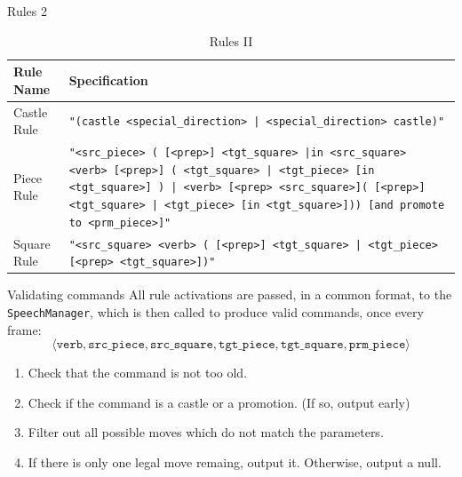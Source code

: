\documentclass[english]{beamer}
\begin{document}
\begin{frame}{Rules 2}
    \begin{table}[h]
        \centering
        \caption{Rules II}
        \small %
        \begin{tabularx}{1.0\textwidth}{|l|X|} %
            \hline
            \textbf{Rule Name} & \textbf{Specification} \\
            \hline 
            Castle Rule & \texttt{"(castle <special\_direction> | <special\_direction> castle)"} \\
            \hline 
            Piece Rule & \texttt{"<src\_piece> ( [<prep>] <tgt\_square> |in <src\_square> <verb> [<prep>] ( <tgt\_square> | <tgt\_piece> [in <tgt\_square>] ) | <verb> [<prep> <src\_square>]( [<prep>] <tgt\_square> | <tgt\_piece>  [in <tgt\_square>])) [and promote to <prm\_piece>]"}\\
            \hline
            Square Rule & \texttt{"<src\_square> <verb> ( [<prep>] <tgt\_square> | <tgt\_piece> [<prep> <tgt\_square>])"}\\
            \hline
        \end{tabularx}
    \end{table}
\end{frame}

\begin{frame}{Validating commands}
    All rule activations are passed, in a common format, to the \texttt{SpeechManager}, which is then called to produce valid commands, once every frame:
    \begin{equation*}
        \langle\texttt{verb},\texttt{src\_piece},\texttt{src\_square},\texttt{tgt\_piece},\texttt{tgt\_square},\texttt{prm\_piece}\rangle
    \end{equation*}
    \vspace*{-.5cm} %
    \begin{enumerate}
        \item Check that the command is not too old.
        \item Check if the command is a castle or a promotion. (If so, output early)
        \item Filter out all possible moves which do not match the parameters.
        \item If there is only one legal move remaing, output it. Otherwise, output a null.
    \end{enumerate}
\end{frame}
\end{document}
